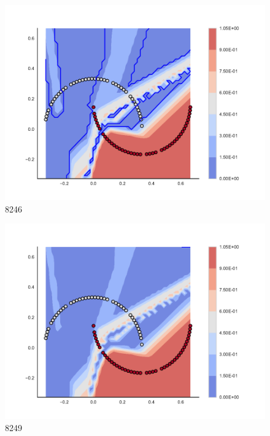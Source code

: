 \begin{subfigure}[b]{0.09\textwidth}
    \includegraphics[clip, trim=2.35cm 1.75cm 4.5cm 0cm,width=\textwidth]{img/convergence/8246.pdf}
    \caption{8246}
    \label{fig:convergence_8246}
\end{subfigure}
%
\begin{subfigure}[b]{0.09\textwidth}
    \includegraphics[clip, trim=2.35cm 1.75cm 4.5cm 0cm,width=\textwidth]{img/convergence/8249.pdf}
    \caption{8249}
    \label{fig:convergence_8249}
\end{subfigure}
%
